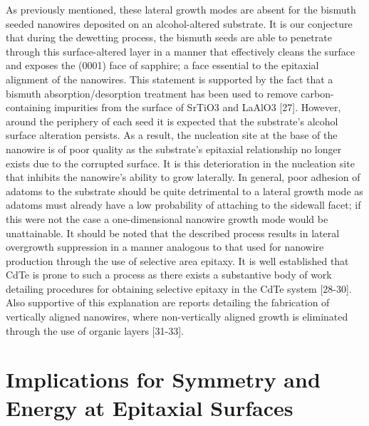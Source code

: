As previously mentioned, these lateral growth modes are
absent for the bismuth seeded nanowires deposited on an
alcohol-altered substrate. It is our conjecture that during the
dewetting process, the bismuth seeds are able to penetrate
through this surface-altered layer in a manner that effectively
cleans the surface and exposes the (0001) face of sapphire;
a face essential to the epitaxial alignment of the nanowires.
This statement is supported by the fact that a bismuth
absorption/desorption treatment has been used to remove
carbon-containing impurities from the surface of SrTiO3 and
LaAlO3 [27]. However, around the periphery of each seed it is
expected that the substrate's alcohol surface alteration persists.
As a result, the nucleation site at the base of the nanowire is of
poor quality as the substrate's epitaxial relationship no longer
exists due to the corrupted surface. It is this deterioration
in the nucleation site that inhibits the nanowire's ability to
grow laterally. In general, poor adhesion of adatoms to the
substrate should be quite detrimental to a lateral growth mode
as adatoms must already have a low probability of attaching to
the sidewall facet; if this were not the case a one-dimensional
nanowire growth mode would be unattainable. It should be
noted that the described process results in lateral overgrowth
suppression in a manner analogous to that used for nanowire
production through the use of selective area epitaxy. It is well
established that CdTe is prone to such a process as there exists
a substantive body of work detailing procedures for obtaining
selective epitaxy in the CdTe system [28-30]. Also supportive
of this explanation are reports detailing the fabrication of
vertically aligned nanowires, where non-vertically aligned
growth is eliminated through the use of organic layers [31-33].


\section{Implications for Symmetry and Energy at Epitaxial Surfaces}